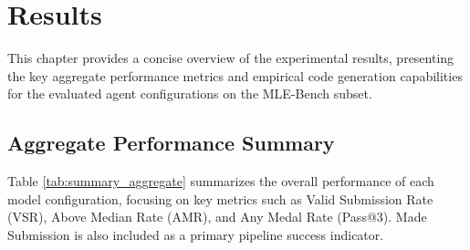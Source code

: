 \chapter{Results}

This chapter provides a concise overview of the experimental results, presenting the key aggregate performance metrics and empirical code generation capabilities for the evaluated agent configurations on the MLE-Bench subset.

\section{Aggregate Performance Summary}

Table \ref{tab:summary_aggregate} summarizes the overall performance of each model configuration, focusing on key metrics such as Valid Submission Rate (VSR), Above Median Rate (AMR), and Any Medal Rate (Pass@3). Made Submission is also included as a primary pipeline success indicator.

